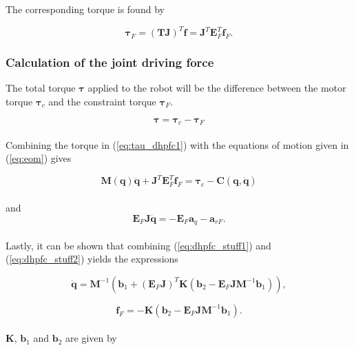 The corresponding torque is found by

\begin{equation}
    \boldsymbol{\tau}_F = (\mathbf{TJ})^T \mathbf{f} = \mathbf{J}^T \mathbf{E}_F^T \mathbf{f}_F.
\end{equation}


\subsubsection{Calculation of the joint driving force}

The total torque $\boldsymbol{\tau}$ applied to the robot will be the difference between the motor torque $\boldsymbol{\tau}_c$ and the constraint torque $\boldsymbol{\tau}_F$.

\begin{equation}\label{eq:tau_dhpfc1}
    \boldsymbol{\tau} = \boldsymbol{\tau}_c - \boldsymbol{\tau}_F
\end{equation}
\\

Combining the torque in (\ref{eq:tau_dhpfc1}) with the equations of motion given in (\ref{eq:eom}) gives

\begin{equation}\label{eq:dhpfc_stuff1}
    \mathbf{M(q) \ddot{q}} + \mathbf{J}^T \mathbf{E}^T_F \mathbf{f}_F = \boldsymbol{\tau}_c - \mathbf{C(q, \dot{q})}
\end{equation}
\\
and
\begin{equation}\label{eq:dhpfc_stuff2}
    \mathbf{E}_F \mathbf{J\ddot{q}} = - \mathbf{E}_F \mathbf{a}_q - \mathbf{a}_{rF}.
\end{equation}
\\
Lastly, it can be shown that combining (\ref{eq:dhpfc_stuff1}) and (\ref{eq:dhpfc_stuff2}) yields the expressions

\begin{equation}
    \mathbf{\ddot{q}} = \mathbf{M}^{-1}(\mathbf{b}_1 + (\mathbf{E}_F \mathbf{J})^T \mathbf{K} (\mathbf{b}_2 - \mathbf{E}_F \mathbf{J} \mathbf{M}^{-1} \mathbf{b}_1)),
\end{equation}

\begin{equation}
    \mathbf{f}_F = -\mathbf{K} (\mathbf{b}_2 - \mathbf{E}_F \mathbf{J} \mathbf{M}^{-1} \mathbf{b}_1).
\end{equation}
\\
$\mathbf{K}$, $\mathbf{b}_1$ and $\mathbf{b}_2$ are given by


